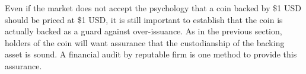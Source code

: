 
Even if the market does not accept the psychology that a coin backed by \$1 USD should be priced at \$1 USD, it is still important to establish that the coin is actually backed as a guard against over-issuance. As in the previous section, holders of the coin will want assurance that the custodianship of the backing asset is sound. A financial audit by reputable firm is one method to provide this assurance. %







